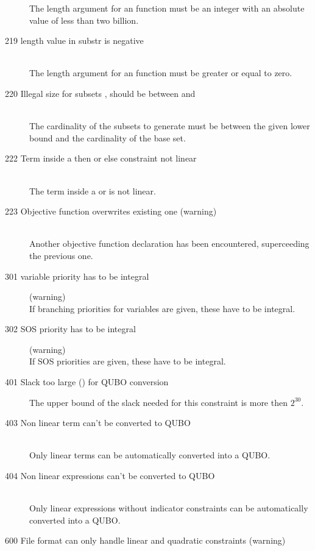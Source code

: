 \begin{description}
   The length argument for an  function
   must be an integer with an absolute value of less than two billion.
\item[219 length value \code{xxx} in substr is negative]\ \\
   The length argument for an  function
   must be greater or equal to zero.
\item[220 Illegal size for subsets \code{xxx}, should be between \code{yyy} 
  and \code{zzz}]\ \\
  The cardinality of the subsets to generate must be between the
  given lower bound and the cardinality of the base set.
\item[222 Term inside a then or else constraint not linear]\ \\
  The term inside a  or  is not linear.
\item[223 Objective function \code{xxx} overwrites existing one
  (warning)]\ \\
  Another objective function declaration has been encountered,
  superceeding the previous one. 
\item[301 variable priority has to be integral] (warning)\ \\
   If branching priorities for variables are given, these have to be integral.
\item[302 SOS priority has to be integral] (warning)\ \\
   If SOS priorities are given, these have to be integral.
\item [401 Slack too large (\code{xxx}) for QUBO conversion]
   The upper bound of the slack needed for this constraint is more then
   $2^{30}$.   
\item [403 Non linear term can't be converted to QUBO]\ \\
  Only linear terms can be automatically converted into a QUBO.
\item [404 Non linear expressions can't be converted to QUBO]\ \\
  Only linear expressions without indicator constraints can be
  automatically converted into a QUBO. 
\item[600 File format can only handle linear and quadratic constraints
         (warning)]\ \\

\end{description}
